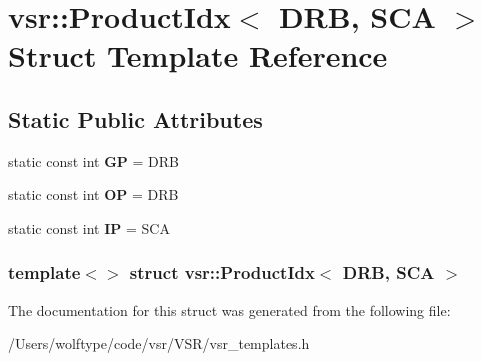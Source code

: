 \hypertarget{structvsr_1_1_product_idx_3_01_d_r_b_00_01_s_c_a_01_4}{\section{vsr\-:\-:Product\-Idx$<$ D\-R\-B, S\-C\-A $>$ Struct Template Reference}
\label{structvsr_1_1_product_idx_3_01_d_r_b_00_01_s_c_a_01_4}
}
\subsection*{Static Public Attributes}
\begin{DoxyCompactItemize}
\item 
\hypertarget{structvsr_1_1_product_idx_3_01_d_r_b_00_01_s_c_a_01_4_afe53201960afe1c6ee63f59b9c2aa485}{static const int {\bfseries G\-P} = D\-R\-B}\label{structvsr_1_1_product_idx_3_01_d_r_b_00_01_s_c_a_01_4_afe53201960afe1c6ee63f59b9c2aa485}

\item 
\hypertarget{structvsr_1_1_product_idx_3_01_d_r_b_00_01_s_c_a_01_4_af66dd3204840a6589575b653dd5ace23}{static const int {\bfseries O\-P} = D\-R\-B}\label{structvsr_1_1_product_idx_3_01_d_r_b_00_01_s_c_a_01_4_af66dd3204840a6589575b653dd5ace23}

\item 
\hypertarget{structvsr_1_1_product_idx_3_01_d_r_b_00_01_s_c_a_01_4_ae74fd102deb54e9368befa480d711f87}{static const int {\bfseries I\-P} = S\-C\-A}\label{structvsr_1_1_product_idx_3_01_d_r_b_00_01_s_c_a_01_4_ae74fd102deb54e9368befa480d711f87}

\end{DoxyCompactItemize}
\subsubsection*{template$<$$>$ struct vsr\-::\-Product\-Idx$<$ D\-R\-B, S\-C\-A $>$}



The documentation for this struct was generated from the following file\-:\begin{DoxyCompactItemize}
\item 
/\-Users/wolftype/code/vsr/\-V\-S\-R/vsr\-\_\-templates.\-h\end{DoxyCompactItemize}
